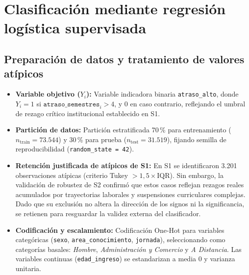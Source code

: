 \documentclass[11pt,a4paper]{article}
\begin{document}
\newpage

\section{Clasificación mediante regresión logística supervisada}

\subsection{Preparación de datos y tratamiento de valores atípicos}
\begin{itemize}[leftmargin=*]
\item \textbf{Variable objetivo ($Y_i$):} Variable indicadora binaria \texttt{atraso\_alto}, donde $Y_i = 1$ si $\texttt{atraso\_semestres}_i > 4$, y $0$ en caso contrario, reflejando el umbral de rezago crítico institucional establecido en S1.
\item \textbf{Partición de datos:} Partición estratificada 70\,\% para entrenamiento ($n_{\text{train}} = 73.544$) y 30\,\% para prueba ($n_{\text{test}} = 31.519$), fijando semilla de reproducibilidad (\texttt{random\_state = 42}).
\item \textbf{Retención justificada de atípicos de S1:} En S1 se identificaron 3.201 observaciones atípicas (criterio Tukey $> 1,5 \times \text{IQR}$). Sin embargo, la validación de robustez de S2 confirmó que estos casos reflejan rezagos reales acumulados por trayectorias laborales y suspensiones curriculares complejas. Dado que su exclusión no altera la dirección de los signos ni la significancia, se retienen para resguardar la validez externa del clasificador.
\item \textbf{Codificación y escalamiento:} Codificación One-Hot para variables categóricas (\texttt{sexo}, \texttt{area\_conocimiento}, \texttt{jornada}), seleccionando como categorías basales: \textit{Hombre}, \textit{Administración y Comercio} y \textit{A Distancia}. Las variables continuas (\texttt{edad\_ingreso}) se estandarizan a media 0 y varianza unitaria.
\end{itemize}
\end{document}
